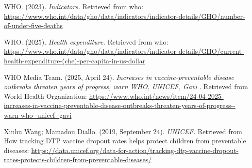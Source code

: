 \documentclass[
]{article}
\begin{document}
WHO. (2023). \emph{Indicators.} Retrieved from who:
\url{https://www.who.int/data/gho/data/indicators/indicator-details/GHO/number-of-under-five-deaths}

WHO. (2025). \emph{Health expenditure.} Retrieved from who:
\url{https://www.who.int/data/gho/data/indicators/indicator-details/GHO/current-health-expenditure-(che)-per-capita-in-us-dollar}

WHO Media Team. (2025, April 24). \emph{Increases in vaccine-preventable
disease outbreaks threaten years of progress, warn WHO, UNICEF, Gavi} .
Retrieved from World Health Organization:
\url{https://www.who.int/news/item/24-04-2025-increases-in-vaccine-preventable-disease-outbreaks-threaten-years-of-progress--warn-who--unicef--gavi}

Xinhu Wang; Mamadou Diallo. (2019, September 24). \emph{UNICEF}.
Retrieved from How tracking DTP vaccine dropout rates helps protect
children from preventable diseases:
\url{https://data.unicef.org/data-for-action/tracking-dtp-vaccine-dropout-rates-protects-children-from-preventable-diseases/}
\end{document}
